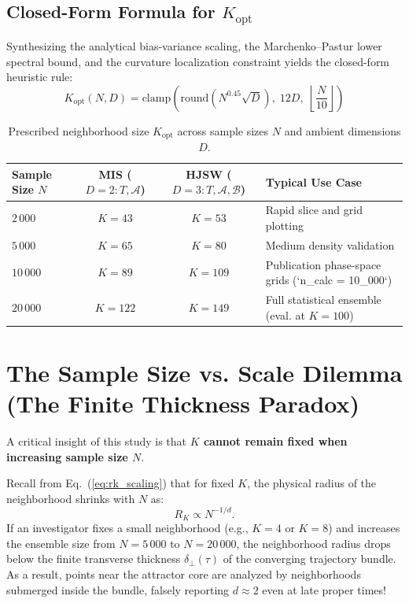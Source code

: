 \documentclass[11pt,a4paper]{article}
\begin{document}
\subsection{Closed-Form Formula for \texorpdfstring{$K_{\mathrm{opt}}$}{K\_opt}}
Synthesizing the analytical bias-variance scaling, the Marchenko--Pastur lower spectral bound, and the curvature localization constraint yields the closed-form heuristic rule:
\begin{equation}
    \boxed{K_{\mathrm{opt}}(N, D) = \mathrm{clamp}\left(\mathrm{round}\left(N^{0.45}\sqrt{D}\right), \; 12D, \; \left\lfloor\frac{N}{10}\right\rfloor\right)}
    \label{eq:k_opt_formula}
\end{equation}

\begin{table}[htbp]
    \centering
    \caption{Prescribed neighborhood size $K_{\mathrm{opt}}$ across sample sizes $N$ and ambient dimensions $D$.}
    \label{tab:k_opt_table}
    \vspace{0.4em}
    \begin{tabularx}{\textwidth}{@{}l c c X@{}}
        \toprule
        \textbf{Sample Size} $N$ & \textbf{MIS} ($D=2: T, \mathcal{A}$) & \textbf{HJSW} ($D=3: T, \mathcal{A}, \mathcal{B}$) & \textbf{Typical Use Case} \\
        \midrule
        $2\,000$ & $K = 43$ & $K = 53$ & Rapid slice and grid plotting \\
        $5\,000$ & $K = 65$ & $K = 80$ & Medium density validation \\
        $10\,000$ & $K = 89$ & $K = 109$ & Publication phase-space grids (`n\_calc = 10\_000`) \\
        $20\,000$ & $K = 122$ & $K = 149$ & Full statistical ensemble (eval. at $K = 100$) \\
        \bottomrule
    \end{tabularx}
\end{table}

\section{The Sample Size vs. Scale Dilemma (The Finite Thickness Paradox)}
\label{sec:sample_size_dilemma}
A critical insight of this study is that \textbf{$K$ cannot remain fixed when increasing sample size $N$}. 

Recall from Eq.~(\ref{eq:rk_scaling}) that for fixed $K$, the physical radius of the neighborhood shrinks with $N$ as:
\begin{equation}
    R_K \propto N^{-1/d}.
\end{equation}
If an investigator fixes a small neighborhood (e.g., $K = 4$ or $K = 8$) and increases the ensemble size from $N = 5\,000$ to $N = 20\,000$, the neighborhood radius drops below the finite transverse thickness $\delta_\perp(\tau)$ of the converging trajectory bundle. As a result, points near the attractor core are analyzed by neighborhoods submerged inside the bundle, falsely reporting $d \approx 2$ even at late proper times!
\end{document}
